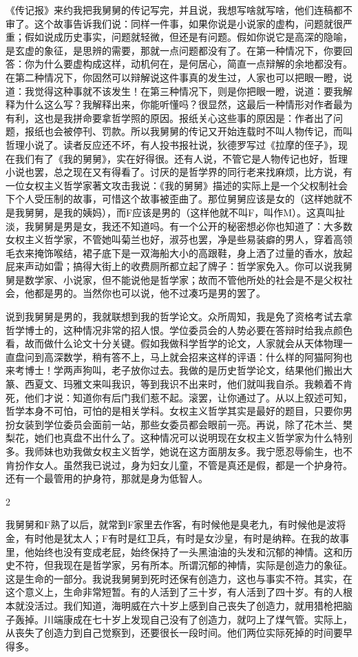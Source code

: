 《传记报》来约我把我舅舅的传记写完，并且说，我想写啥就写啥，他们连稿都不审了。这个故事告诉我们说：同样一件事，如果你说是小说家的虚构，问题就很严重；假如说成历史事实，问题就轻微，但还是有问题。假如你说它是高深的隐喻，是玄虚的象征，是思辨的需要，那就一点问题都没有了。在第一种情况下，你要回答：你为什么要虚构成这样，动机何在，是何居心，简直一点辩解的余地都没有。在第二种情况下，你固然可以辩解说这件事真的发生过，人家也可以把眼一瞪，说道：我觉得这种事就不该发生！在第三种情况下，则是你把眼一瞪，说道：要我解释为什么这么写？我解释出来，你能听懂吗？很显然，这最后一种情形对作者最为有利，这也是我拼命要拿哲学照的原因。报纸关心这些事的原因是：作者出了问题，报纸也会被停刊、罚款。所以我舅舅的传记又开始连载时不叫人物传记，而叫哲理小说了。读者反应还不坏，有人投书报社说，狄德罗写过《拉摩的侄子》，现在我们有了《我的舅舅》，实在好得很。还有人说，不管它是人物传记也好，哲理小说也罢，总之现在又有得看了。讨厌的是哲学界的同行老来找麻烦，比方说，有一位女权主义哲学家著文攻击我说：《我的舅舅》描述的实际上是一个父权制社会下个人受压制的故事，可惜这个故事被歪曲了。那位舅舅应该是女的（这样她就不是我舅舅，是我的姨妈），而F应该是男的（这样他就不叫F，叫作M）。这真叫扯淡，我舅舅是男是女，我还不知道吗。有一个公开的秘密想必你也知道了：大多数女权主义哲学家，不管她叫菊兰也好，淑芬也罢，净是些易装癖的男人，穿着高领毛衣来掩饰喉结，裙子底下是一双海船大小的高跟鞋，身上洒了过量的香水，放起屁来声动如雷；搞得大街上的收费厕所都立起了牌子：哲学家免入。你可以说我舅舅是数学家、小说家，但不能说他是哲学家；故而不管他所处的社会是不是父权社会，他都是男的。当然你也可以说，他不过凑巧是男的罢了。 

说到我舅舅是男的，我就联想到我的哲学论文。众所周知，我是免了资格考试去拿哲学博士的，这种情况非常的招人恨。学位委员会的人势必要在答辩时给我点颜色看，故而做什么论文十分关键。假如我做科学哲学的论文，人家就会从天体物理一直盘问到高深数学，稍有答不上，马上就会招来这样的评语：什么样的阿猫阿狗也来考博士！学两声狗叫，老子放你过去。我做的是历史哲学论文，结果他们搬出大篆、西夏文、玛雅文来叫我识，等到我识不出来时，他们就叫我自杀。我赖着不肯死，他们才说：知道你有后门我们惹不起。滚罢，让你通过了。从以上叙述可知，哲学本身不可怕，可怕的是相关学科。女权主义哲学其实是最好的题目，只要你男扮女装到学位委员会面前一站，那些女委员都会眼前一亮。再说，除了花木兰、樊梨花，她们也真盘不出什么了。这种情况可以说明现在女权主义哲学家为什么特别多。我师妹也劝我做女权主义哲学，她说在这方面朋友多。我宁愿忍辱偷生，也不肯扮作女人。虽然我已说过，身为妇女儿童，不管是真还是假，都是一个护身符。还有一个最管用的护身符，那就是身为低智人。 

2 

我舅舅和F熟了以后，就常到F家里去作客，有时候他是臭老九，有时候他是波将金，有时他是犹太人；F有时是红卫兵，有时是女沙皇，有时是纳粹。在我的故事里，他始终也没有变成老屁，始终保持了一头黑油油的头发和沉郁的神情。这和历史不符，但我现在是哲学家，另有所本。所谓沉郁的神情，实际是创造力的象征。这是生命的一部分。我说我舅舅到死时还保有创造力，这也与事实不符。其实，在这个意义上，生命非常短暂。有的人活到了三十岁，有人活到了四十岁。有的人根本就没活过。我们知道，海明威在六十岁上感到自己丧失了创造力，就用猎枪把脑子轰掉。川端康成在七十岁上发现自己没有了创造力，就叼上了煤气管。实际上，从丧失了创造力到自己觉察到，还要很长一段时间。他们两位实际死掉的时间要早得多。 

